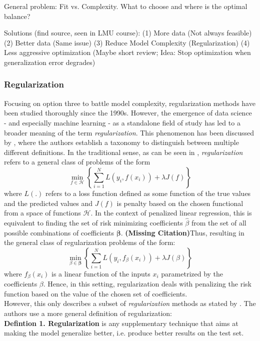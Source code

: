 \documentclass[12pt,a4paper]{article}
\newcommand{\MC}{\textbf{(Missing Citation)}} %
\begin{document}
General problem: Fit vs. Complexity. What to choose and where is the optimal balance?

Solutions (find source, seen in LMU course): (1) More data (Not always feasible) (2) Better data (Same issue) (3) Reduce Model Complexity (Regularization) (4) Less aggressive optimization (Maybe short review; Idea: Stop optimization when generalization error degrades)

\subsubsection{Regularization}

Focusing on option three to battle model complexity, regularization methods have been studied thoroughly since the 1990s. However, the emergence of data science - and especially machine learning - as a standalone field of study has led to a broader meaning of the term \textit{regularization}. This phenomenon has been discussed by \textcite{Taxonomy2017}, where the authors establish a taxonomy to distinguish between multiple different definitions. In the traditional sense, as can be seen in \textcite[167--170]{ESL2009}, \textit{regularization} refers to a general class of problems of the form
\[
\underset{f \in \mathcal{H}}{\min}\left\{\sum_{i=1}^N L(y_i, f(x_i)) + \lambda{J}(f)\right\}
\]
where $L(.)$ refers to a loss function defined as some function of the true values and the predicted values and $J(f)$ is penalty based on the chosen functional from a space of functions $\mathcal{H}$. In the context of penalized linear regression, this is equivalent to finding the set of risk minimizing coefficients $\hat{\beta}$ from the set of all possible combinations of coefficients $\boldsymbol{\beta}$. \MC Thus, resulting in the general class of regularization problems of the form:
\[
\underset{\beta \in \boldsymbol{\beta}}{\min}\left\{\sum_{i=1}^N L(y_i, f_\beta(x_i)) + \lambda{J}(\beta)\right\}
\]
where $f_\beta(x_i)$ is a linear function of the inputs $x_i$ parametrized by the coefficients $\beta$. Hence, in this setting, regularization deals with penalizing the risk function based on the value of the chosen set of coefficients. \\
However, this only describes a subset of \textit{regularization} methods as stated by \textcite{Taxonomy2017}. The authors use a more general definition of regularization:\\

\textbf{Defintion 1. Regularization} is any supplementary technique that aims at making the model generalize better, i.e. produce better results on the test set.\\
\end{document}
